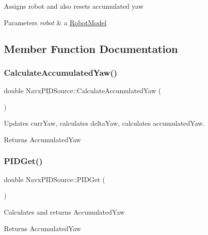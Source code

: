 Assigns robot and also resets accumulated yaw 
\begin{DoxyParams}{Parameters}
{\em robot} & a \hyperlink{class_robot_model}{Robot\+Model} \\
\hline
\end{DoxyParams}


\subsection{Member Function Documentation}
\mbox{\label{class_navx_p_i_d_source_ac9a334ad2d3d561f4b7e0d4686a1e3c3}} 
\subsubsection{\texorpdfstring{Calculate\+Accumulated\+Yaw()}{CalculateAccumulatedYaw()}}
{\footnotesize\ttfamily double Navx\+P\+I\+D\+Source\+::\+Calculate\+Accumulated\+Yaw (\begin{DoxyParamCaption}{ }\end{DoxyParamCaption})}

Updates curr\+Yaw, calculates delta\+Yaw, calculates accumulated\+Yaw. \begin{DoxyReturn}{Returns}
Accumulated\+Yaw 
\end{DoxyReturn}
\mbox{\label{class_navx_p_i_d_source_af3d4863c8b9338340739bf0d85371827}} 
\subsubsection{\texorpdfstring{P\+I\+D\+Get()}{PIDGet()}}
{\footnotesize\ttfamily double Navx\+P\+I\+D\+Source\+::\+P\+I\+D\+Get (\begin{DoxyParamCaption}{ }\end{DoxyParamCaption})}

Calculates and returns Accumulated\+Yaw \begin{DoxyReturn}{Returns}
Accumulated\+Yaw 
\end{DoxyReturn}
\mbox{\label{class_navx_p_i_d_source_a553daca7b260429b4808791ff11ada54}} 
